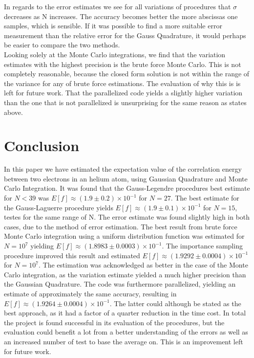 \documentclass[%
reprint,nofootinbib,
amsmath,amssymb,
aps,
]{revtex4-1}
\begin{document}
In regards to the error estimates we see for all variations of procedures that $\sigma$ decreases as N increases. The accuracy becomes better the more abscissas one samples, which is sensible. If it was possible to find a more suitable error measurement than the relative error for the Gauss Quadrature, it would perhaps be easier to compare the two methods. \\ \indent 
Looking solely at the Monte Carlo integrations, we find that the variation estimates with the highest precision is the brute force Monte Carlo. This is not completely reasonable, because the closed form solution is not within the range of the variance for any of brute force estimations. The evaluation of why this is is left for future work. That the parallelized code yields a slightly higher variation than the one that is not parallelized is unsurprising for the same reason as states above. 

\section{Conclusion} \noindent 
In this paper we have estimated the expectation value of the correlation energy between two electrons in an helium atom, using Gaussian Quadrature and Monte Carlo Integration. It was found that the Gauss-Legendre procedures best estimate for $N<39$ was $E[f] \approx (1.9 \pm 0.2)\times 10^{-1}$ for $N=27$. The best estimate for the Gauss-Laguerre procedure yields $E[f]\approx (1.9 \pm 0.1)\times 10^{-1}$ for $N=15$, testes for the same range of N. The error estimate was found slightly high in both cases, due to the method of error estimation. The best result from brute force Monte Carlo integration using a uniform distribution function was estimated for $N=10^7$ yielding $E[f]\approx (1.8983 \pm 0.0003)\times 10^{-1}$. The importance sampling procedure improved this result and estimated $E[f]\approx (1.9292 \pm 0.0004)\times 10^{-1}$ for $N=10^7$. The estimation was acknowledged as better in the case of the Monte Carlo integration, as the variation estimate yielded a much higher precision than the Gaussian Quadrature. The code was furthermore parallelized, yielding an estimate of approximately the same accuracy, resulting in $E[f]\approx (1.9264 \pm 0.0004)\times 10^{-1}$. The latter could although be stated as the best approach, as it had a factor of a quarter reduction in the time cost. In total the project is found successful in its evaluation of the procedures, but the evaluation could benefit a lot from a better understanding of the errors as well as an increased number of test to base the average on. This is an improvement left for future work. 
\end{document}
